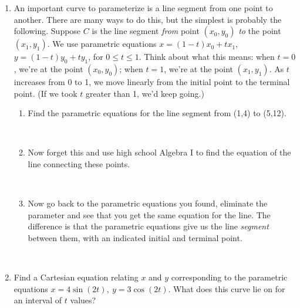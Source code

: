\documentclass[11pt, oneside]{article}   	%
\title{}
\author{Week 14 discussion problems}
\date{}							%
\begin{document}
\maketitle

\begin{enumerate}
\item An important curve to parameterize is a line segment from one point to another. There are many ways to do this, but the simplest is probably the following. Suppose $C$ is the  line segment \emph{from} point $(x_0,y_0)$ \emph{to} the point $(x_1,y_1)$. We use parametric equations $x=(1-t)x_0+tx_1$, $y=(1-t)y_0+ty_1$, for $0 \le t \le 1.$ Think about what this means: when $t=0$, we're at the point $(x_0,y_0)$; when $t=1$, we're at the point $(x_1,y_1)$. As $t$ increases from 0 to 1, we move linearly from the initial point to the terminal point. (If we took $t$ greater than 1, we'd keep going.) 
\begin{enumerate} 

\item Find the parametric equations for the line segment from (1,4) to (5,12).

\

\item Now forget this and use high school Algebra I to find the equation of the line connecting these points.

\

\item Now go back to the parametric equations you found, eliminate the parameter and see that you get the same equation for the line.  The difference is that the parametric equations give us the line \emph{segment} between them, with an indicated initial and terminal point.

\end{enumerate}

\

\item Find a Cartesian equation relating $x$ and $y$ corresponding to the parametric equations $x=4\sin(2t), \ y=3\cos(2t)$. What does this curve lie on for an interval of $t$ values?

\


\end{enumerate}
\end{document}
